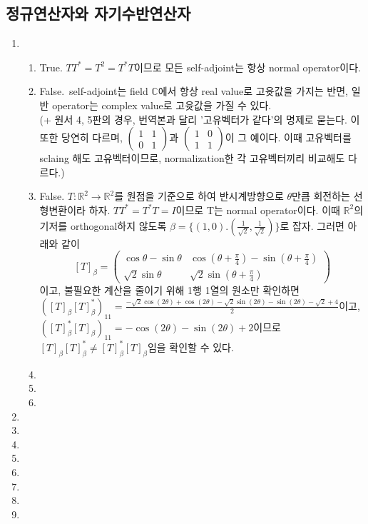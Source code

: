 \documentclass{oblivoir}
\begin{document}
\subsection{정규연산자와 자기수반연산자}
\begin{enumerate}
    \item 
    \begin{enumerate}
        \item True. \(TT^* = T^2 = T^*T\)이므로 모든 self-adjoint는 항상 normal operator이다.
        \item False.\ self-adjoint는 field \(\mathbb{C}\)에서 항상 real value로 고윳값을 가지는 반면, 일반 operator는 complex value로 고윳값을 가질 수 있다.\\ (+ 원서 4, 5판의 경우, 번역본과 달리 '고유벡터가 같다'의 명제로 묻는다. 이 또한 당연히 다르며, \(\begin{pmatrix} 1&1\\0&1\end{pmatrix}\)과 \(\begin{pmatrix} 1&0\\1&1\end{pmatrix}\)이 그 예이다. 이때 고유벡터를 sclaing 해도 고유벡터이므로, normalization한 각 고유벡터끼리 비교해도 다르다.)
        \item False. \(T:{\mathbb{R}}^2\rightarrow{\mathbb{R}}^2\)를 원점을 기준으로 하여 반시계방향으로 \(\theta\)만큼 회전하는 선형변환이라 하자. \(TT^*=T^*T=I\)이므로 T는 normal operator이다. 이때 \(\mathbb{R}^2\)의 기저를 orthogonal하지 않도록 \(\beta=\{(1, 0). (\frac{1}{\sqrt{2}}, \frac{1}{\sqrt{2}})\}\)로 잡자. 그러면 아래와 같이 \[[T]_\beta = \begin{pmatrix} \cos\theta-\sin\theta&\cos(\theta+\frac{\pi}{4})-\sin(\theta+\frac{\pi}{4})\\\sqrt{2}\sin\theta&\sqrt{2}\sin(\theta+\frac{\pi}{4})\end{pmatrix}\]이고, 불필요한 계산을 줄이기 위해 1행 1열의 원소만 확인하면 \(([T]_\beta[T]^*_\beta)_{11} = \frac{-\sqrt{2}\cos(2\theta)+\cos(2\theta)-\sqrt{2}\sin(2\theta)-\sin(2\theta)-\sqrt{2}+4}{2}\)이고, \({([T]^*_\beta[T]_\beta)}_{11}=-\cos(2\theta)-\sin(2\theta)+2\)이므로 \([T]_\beta[T]^*_\beta \neq [T]^*_\beta[T]_\beta\)임을 확인할 수 있다.
        \item 
        \item 
        \item 
    \end{enumerate}
    \item 
    \item 
    \item 
    \item 
    \item 
    \item 
    \item 
    \item 
\end{enumerate}
\end{document}
